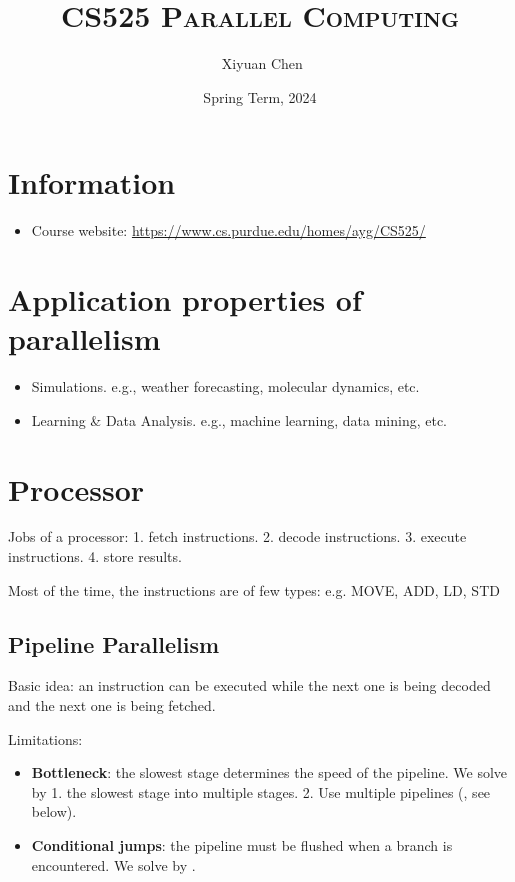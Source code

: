 \documentclass{../../ainote}
\author{\ccLogo \,\,Xiyuan Chen}
\title{\textsc{CS525 Parallel Computing}}
\date{Spring Term, 2024}
\begin{document}
\maketitle
\doclicenseThis
\section*{Information}
\begin{itemize}
	\item Course website: \url{https://www.cs.purdue.edu/homes/ayg/CS525/}
\end{itemize}
\tableofcontents
\newpage

\section{Application properties of parallelism}
\begin{itemize}
    \item Simulations. e.g., weather forecasting, molecular dynamics, etc.
    \item Learning \& Data Analysis. e.g., machine learning, data mining, etc.
\end{itemize}

\section{Processor}
Jobs of a processor: 1. fetch instructions. 2. decode instructions. 3. execute instructions. 4. store results.

Most of the time, the instructions are of few types: e.g. MOVE, ADD, LD, STD

\subsection{Pipeline Parallelism}
Basic idea: an instruction can be executed while the next one is being decoded and the next one is being fetched.

Limitations: 
\begin{itemize}
    \item \textbf{Bottleneck}: the slowest stage determines the speed of the pipeline. We solve by 1.  the slowest stage into multiple stages. 2. Use multiple pipelines (, see below).
    \item \textbf{Conditional jumps}: the pipeline must be flushed when a branch is encountered. We solve by .
\end{itemize}
\end{document}

